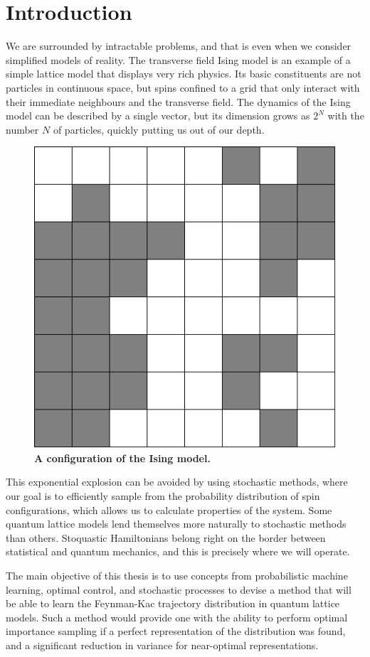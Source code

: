 
\chapter{Introduction}
\label{chapter1}

We are surrounded by intractable problems, and that is even when we consider simplified models of reality. The transverse field Ising model is an example of a simple lattice model that displays very rich physics. Its basic constituents are not particles in continuous space, but spins confined to a grid that only interact with their immediate neighbours and the transverse field. The dynamics of the Ising model can be described by a single vector, but its dimension grows as $2^N$ with the number $N$ of particles, quickly putting us out of our depth. 
\begin{figure}[h]
	\centering
	\includegraphics[width=0.25\linewidth]{Chapter1/ising_passive0}
	\caption[A configuration of the Ising model.]{\textbf{A configuration of the Ising model.}}
	\label{fig:isingpassive0}
\end{figure}
This exponential explosion can be avoided by using stochastic methods, where our goal is to efficiently sample from the probability distribution of spin configurations, which allows us to calculate properties of the system. Some quantum lattice models lend themselves more naturally to stochastic methods than others. Stoquastic Hamiltonians belong right on the border between statistical and quantum mechanics, and this is precisely where we will operate.

The main objective of this thesis is to use concepts from probabilistic machine learning, optimal control, and stochastic processes to devise a method that will be able to learn the Feynman-Kac trajectory distribution in quantum lattice models. Such a method would provide one with the ability to perform optimal importance sampling if a perfect representation of the distribution was found, and a significant reduction in variance for near-optimal representations. 

